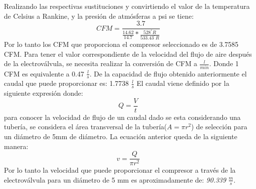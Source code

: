 Realizando las respectivas sustituciones y convirtiendo el valor de la temperatura de Celsius a  Rankine, y la presi\'on de atmósferas a psi se tiene:
\begin{equation}
	CFM=\frac{3.7}{\frac{14.62}{14.7}*\frac{528^\circ R}{533.43^\circ R}}
\end{equation}
Por lo tanto los CFM que proporciona el compresor seleccionado es de 3.7585 CFM.
\newline
Para tener el valor correspondiente de la velocidad del flujo de aire después de la electrov\'alvula, se necesita realizar la conversión de CFM a $\frac{l}{min}$. Donde 1 CFM es equivalente a 0.47 $\frac{l}{s}$. De la capacidad de flujo obtenido anteriormente el caudal que puede proporcionar es: 1.7738 $\frac{l}{s}$
\newline
El caudal viene definido por la siguiente expresi\'on donde:
\begin{equation}
	Q=\frac{V}{t}
\end{equation}
para conocer la velocidad de flujo de un caudal dado se esta considerando una tubería, se considera el área transversal de la tubería($A=\pi r^2$) de selección para un diámetro de 5mm de diámetro. 
\newline
La ecuación anterior queda de la siguiente manera: 
\begin{equation}
	v=\frac{Q}{\pi r^2}
\end{equation}
Por lo tanto la velocidad que puede proporcionar el compresor a través de la electrov\'alvula para un diámetro de 5 mm es aproximadamente de: \textit {90.339} $\frac{m}{s}$\cite{Atlas2014}.